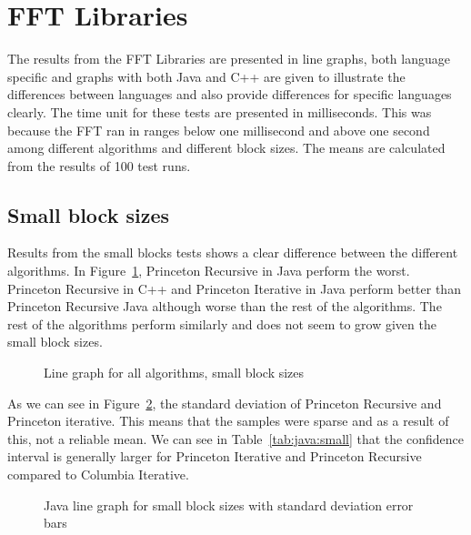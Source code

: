 \section{FFT Libraries}

The results from the FFT Libraries are presented in line graphs, both language specific and graphs with both Java and C++ are given to illustrate the differences between languages and also provide differences for specific languages clearly. The time unit for these tests are presented in milliseconds. This was because the FFT ran in ranges below one millisecond and above one second among different algorithms and different block sizes. The means are calculated from the results of 100 test runs.

\subsection{Small block sizes}
Results from the small blocks tests shows a clear difference between the different algorithms. In Figure~\ref{fig:all:line:small}, Princeton Recursive in Java perform the worst. Princeton Recursive in C++ and Princeton Iterative in Java perform better than Princeton Recursive Java although worse than the rest of the algorithms. The rest of the algorithms perform similarly and does not seem to grow given the small block sizes.




\begin{figure}
    \centering
    
    \caption{Line graph for all algorithms, small block sizes}
    \label{fig:all:line:small}
\end{figure}

As we can see in Figure~\ref{fig:java:line:small}, the standard deviation of Princeton Recursive and Princeton iterative. This means that the samples were sparse and as a result of this, not a reliable mean. We can see in Table~\ref{tab:java:small} that the confidence interval is generally larger for Princeton Iterative and Princeton Recursive compared to Columbia Iterative.

\begin{figure}
    \centering
    
    \caption{Java line graph for small block sizes with standard deviation error bars}
    \label{fig:java:line:small}
\end{figure}

